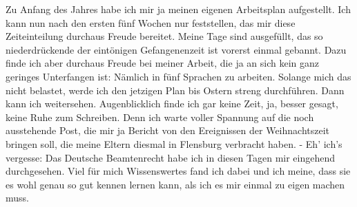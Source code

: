 \def\day{11. Februar 1942{\color{red} [sic] }}
\mktitle

Zu Anfang des Jahres habe ich mir ja meinen eigenen Arbeitsplan aufgestellt.
Ich kann nun nach den ersten f\"{u}nf Wochen nur feststellen, das mir diese Zeiteinteilung durchaus Freude bereitet.
Meine Tage sind ausgef\"{u}llt, das so niederdr\"{u}ckende der eint\"{o}nigen Gefangenenzeit ist vorerst einmal gebannt.
Dazu finde ich aber durchaus Freude bei meiner Arbeit, die ja an sich kein ganz geringes Unterfangen ist: N\"{a}mlich in f\"{u}nf Sprachen zu arbeiten.
Solange mich das nicht belastet, werde ich den jetzigen Plan bis Ostern streng durchf\"{u}hren.
Dann kann ich weitersehen.
Augenblicklich finde ich gar keine Zeit, ja, besser gesagt, keine Ruhe zum Schreiben.
Denn ich warte voller Spannung auf die noch ausstehende Post, die mir ja Bericht von den Ereignissen der Weihnachtszeit bringen soll, die meine Eltern diesmal in Flensburg verbracht haben.
- Eh' ich's vergesse: Das Deutsche Beamtenrecht habe ich in diesen Tagen mir eingehend durchgesehen.
Viel f\"{u}r mich Wissenswertes fand ich dabei und ich meine, dass sie es wohl genau so gut kennen lernen kann, als ich es mir einmal zu eigen machen muss.

\clearpage
